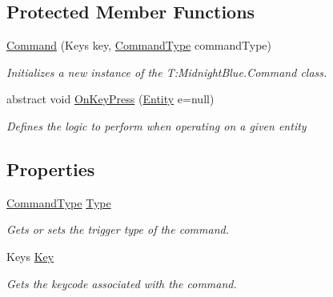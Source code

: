 \subsection*{Protected Member Functions}
\begin{DoxyCompactItemize}
\item 
\hyperlink{class_midnight_blue_1_1_engine_1_1_i_o_1_1_command_a5f50fc0c3fb129b6d94d0f78a75a2cf2}{Command} (Keys key, \hyperlink{namespace_midnight_blue_1_1_engine_1_1_i_o_a8bc3f159399ecadd590f7df1b54354b0}{Command\+Type} command\+Type)
\begin{DoxyCompactList}\small\item\em Initializes a new instance of the T\+:\+Midnight\+Blue.\+Command class. \end{DoxyCompactList}\item 
abstract void \hyperlink{class_midnight_blue_1_1_engine_1_1_i_o_1_1_command_ae641d2c1a9db17f03ee6b7854b00a9d2}{On\+Key\+Press} (\hyperlink{class_midnight_blue_1_1_engine_1_1_entity_component_1_1_entity}{Entity} e=null)
\begin{DoxyCompactList}\small\item\em Defines the logic to perform when operating on a given entity \end{DoxyCompactList}\end{DoxyCompactItemize}
\subsection*{Properties}
\begin{DoxyCompactItemize}
\item 
\hyperlink{namespace_midnight_blue_1_1_engine_1_1_i_o_a8bc3f159399ecadd590f7df1b54354b0}{Command\+Type} \hyperlink{class_midnight_blue_1_1_engine_1_1_i_o_1_1_command_ac423cb29bcb47794c22ad6f5b0847ee6}{Type}
\begin{DoxyCompactList}\small\item\em Gets or sets the trigger type of the command. \end{DoxyCompactList}\item 
Keys \hyperlink{class_midnight_blue_1_1_engine_1_1_i_o_1_1_command_a01ee6a88fbfdc3c5aa0984720f6c4cce}{Key}
\begin{DoxyCompactList}\small\item\em Gets the keycode associated with the command. \end{DoxyCompactList}\end{DoxyCompactItemize}


